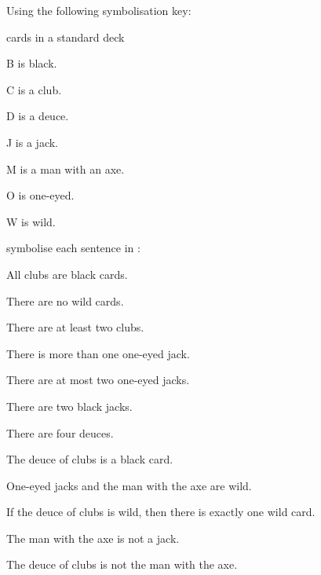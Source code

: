\problempart
\label{pr.FOLcards}
Using the following symbolisation key:
\begin{ekey}
\item[\text{domain}] cards in a standard deck
\item[B]  is black.
\item[C]  is a club.
\item[D]  is a deuce.
\item[J]  is a jack.
\item[M]  is a man with an axe.
\item[O]  is one-eyed.
\item[W]  is wild.
\end{ekey}
symbolise each sentence in \FOL:
\begin{earg}
\item All clubs are black cards.
\item There are no wild cards.
\item There are at least two clubs.
\item There is more than one one-eyed jack.
\item There are at most two one-eyed jacks.
\item There are two black jacks.
\item There are four deuces.
\item The deuce of clubs is a black card.
\item One-eyed jacks and the man with the axe are wild.
\item If the deuce of clubs is wild, then there is exactly one wild card.
\item The man with the axe is not a jack.
\item The deuce of clubs is not the man with the axe.
\end{earg}


